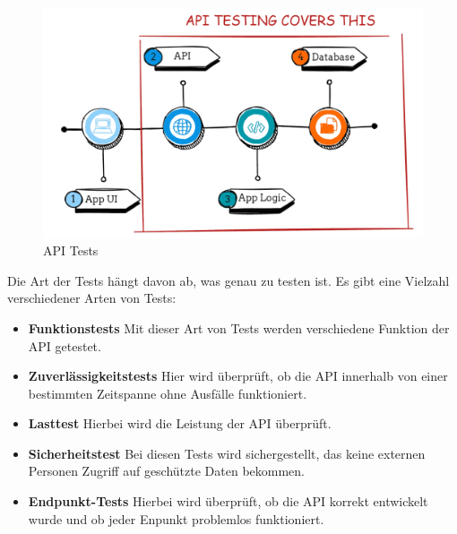 \begin{figure}[h!]
    \centering
    \includegraphics[width=0.8\linewidth]{pics/api-tests.png}
    \caption{API Tests}
    \label{fig:enter-label}
\end{figure}


Die Art der Tests hängt davon ab, was genau zu testen ist. Es gibt eine Vielzahl verschiedener Arten von Tests:
\begin{itemize}
    \item \textbf{Funktionstests}
        \newline
        Mit dieser Art von Tests werden verschiedene Funktion der API getestet.
    \item \textbf{Zuverlässigkeitstests}
        \newline
        Hier wird überprüft, ob die API innerhalb von einer bestimmten Zeitspanne ohne Ausfälle funktioniert.
    \item \textbf{Lasttest}
        \newline
        Hierbei wird die Leistung der API überprüft. 
    \item \textbf{Sicherheitstest}
        \newline
        Bei diesen Tests wird sichergestellt, das keine externen Personen Zugriff auf geschützte Daten bekommen.
    \item \textbf{Endpunkt-Tests}
        \newline
        Hierbei wird überprüft, ob die API korrekt entwickelt wurde und ob jeder Enpunkt problemlos funktioniert.
\end{itemize}



\newpage
